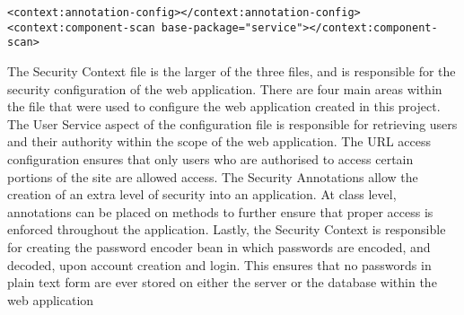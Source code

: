 \begin{lstlisting}
<context:annotation-config></context:annotation-config>
<context:component-scan base-package="service"></context:component-scan>
\end{lstlisting}

The Security Context file is the larger of the three files, and is responsible for the security configuration of the web application. There are four main areas within the file that were used to configure the web application created in this project. \newline The User Service aspect of the configuration file is responsible for retrieving users and their authority within the scope of the web application. \newline The URL access configuration ensures that only users who are authorised to access certain portions of the site are allowed access. \newline The Security Annotations allow the creation of an extra level of security into an application. At class level, annotations can be placed on methods to further ensure that proper access is enforced throughout the application. \newline Lastly, the Security Context is responsible for creating the password encoder bean in which passwords are encoded, and decoded, upon account creation and login. This ensures that no passwords in plain text form are ever stored on either the server or the database within the web application \pagebreak

